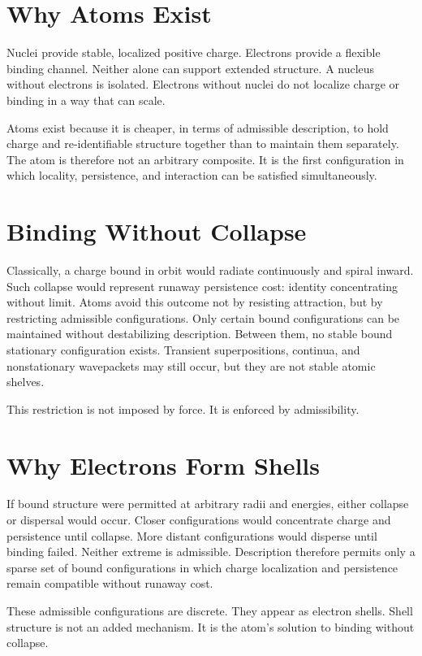 \documentclass[11pt,twoside,openright]{book}
\begin{document}
\section*{Why Atoms Exist}

Nuclei provide stable, localized positive charge. Electrons provide a flexible binding channel. Neither alone can support extended structure. A nucleus without electrons is isolated. Electrons without nuclei do not localize charge or binding in a way that can scale.

Atoms exist because it is cheaper, in terms of admissible description, to hold charge and re-identifiable structure together than to maintain them separately. The atom is therefore not an arbitrary composite. It is the first configuration in which locality, persistence, and interaction can be satisfied simultaneously.

\section*{Binding Without Collapse}

Classically, a charge bound in orbit would radiate continuously and spiral inward. Such collapse would represent runaway persistence cost: identity concentrating without limit. Atoms avoid this outcome not by resisting attraction, but by restricting admissible configurations. Only certain bound configurations can be maintained without destabilizing description. Between them, no stable bound stationary configuration exists. Transient superpositions, continua, and nonstationary wavepackets may still occur, but they are not stable atomic shelves.

This restriction is not imposed by force. It is enforced by admissibility.

\section*{Why Electrons Form Shells}

If bound structure were permitted at arbitrary radii and energies, either collapse or dispersal would occur. Closer configurations would concentrate charge and persistence until collapse. More distant configurations would disperse until binding failed. Neither extreme is admissible. Description therefore permits only a sparse set of bound configurations in which charge localization and persistence remain compatible without runaway cost.

These admissible configurations are discrete. They appear as electron shells. Shell structure is not an added mechanism. It is the atom's solution to binding without collapse.
\end{document}
